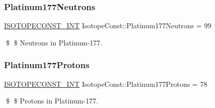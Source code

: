 \subsubsection{\texorpdfstring{Platinum177\+Neutrons}{Platinum177Neutrons}}
{\footnotesize\ttfamily \mbox{\hyperlink{group___isotope_const-_macros_ga5f18360b3e99483a35c32d789e62621c}{I\+S\+O\+T\+O\+P\+E\+C\+O\+N\+S\+T\+\_\+\+I\+NT}} Isotope\+Const\+::\+Platinum177\+Neutrons = 99}

\$ \$ Neutrons in Platinum-\/177. \mbox{\label{group___isotope_const-_platinum-_pt177_gaae8d7df04be34894630fa19b7f3f17fc}} 
\subsubsection{\texorpdfstring{Platinum177\+Protons}{Platinum177Protons}}
{\footnotesize\ttfamily \mbox{\hyperlink{group___isotope_const-_macros_ga5f18360b3e99483a35c32d789e62621c}{I\+S\+O\+T\+O\+P\+E\+C\+O\+N\+S\+T\+\_\+\+I\+NT}} Isotope\+Const\+::\+Platinum177\+Protons = 78}

\$ \$ Protons in Platinum-\/177. 